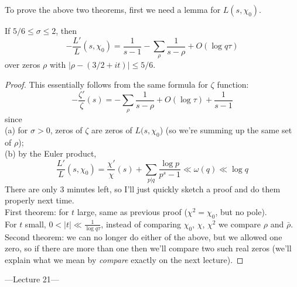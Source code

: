 \documentclass[a4paper]{article}
\begin{document}
To prove the above two theorems, first we need a lemma for $L(s,\chi_0)$.
\begin{lemma}
If $5/6 \leq \sigma \leq 2$, then
\[
-\frac{L'}{L}(s,\chi_0) = \frac{1}{s-1} - \sum_\rho \frac{1}{s-\rho} + O(\log q\tau)
\]
over zeros $\rho$ with $|\rho-(3/2+it)| \leq 5/6$.
\begin{proof}
This essentially follows from the same formula for $\zeta$ function:
\[
-\frac{\zeta'}{\zeta}(s) = -\sum_\rho \frac{1}{s-\rho}+O(\log \tau) + \frac{1}{s-1}
\]
since\\
(a) for $\sigma>0$, zeros of $\zeta$ are zeros of $L(s,\chi_0$) (so we're summing up the same set of $\rho$);\\
(b) by the Euler product,
\[
\frac{L'}{L}(s,\chi_0) = \frac{\chi'}{\chi}(s) + \sum_{p|q} \frac{\log p}{p^s-1} \ll \omega(q) \ll \log q
\]
There are only 3 minutes left, so I'll just quickly sketch a proof and do them properly next time.\\
First theorem: for $t$ large, same as previous proof ($\chi^2=\chi_0$, but no pole).\\
For $t$ small, $0 < |t| \ll \frac{1}{\log q\tau}$, instead of comparing $\chi_0$, $\chi$, $\chi^2$ we compare $\rho$ and $\bar{\rho}$.\\
Second theorem: we can no longer do either of the above, but we allowed one zero, so if there are more than one then we'll compare two such real zeros (we'll explain what we mean by \emph{compare} exactly on the next lecture).
\end{proof}
\end{lemma}

---Lecture 21---
\end{document}
